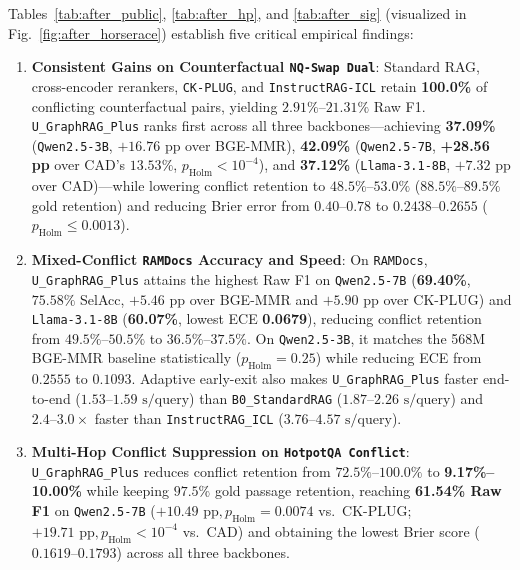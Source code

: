 \documentclass[11pt]{article}
\begin{document}
Tables~\ref{tab:after_public}, \ref{tab:after_hp}, and \ref{tab:after_sig} (visualized in Fig.~\ref{fig:after_horserace}) establish five critical empirical findings:
\begin{enumerate}[leftmargin=*,nosep]
    \item \textbf{Consistent Gains on Counterfactual \texttt{NQ-Swap Dual}}: Standard RAG, cross-encoder rerankers, \texttt{CK-PLUG}, and \texttt{InstructRAG-ICL} retain \textbf{100.0\%} of conflicting counterfactual pairs, yielding $2.91\%\text{--}21.31\%$ Raw F1. \texttt{U\_GraphRAG\_Plus} ranks first across all three backbones---achieving \textbf{37.09\%} (\texttt{Qwen2.5-3B}, $+16.76\text{ pp}$ over BGE-MMR), \textbf{42.09\%} (\texttt{Qwen2.5-7B}, \textbf{+28.56 pp} over CAD's $13.53\%$, $p_{\text{Holm}}<10^{-4}$), and \textbf{37.12\%} (\texttt{Llama-3.1-8B}, $+7.32\text{ pp}$ over CAD)---while lowering conflict retention to $48.5\%\text{--}53.0\%$ ($88.5\%\text{--}89.5\%$ gold retention) and reducing Brier error from $0.40\text{--}0.78$ to $0.2438\text{--}0.2655$ ($p_{\text{Holm}}\le 0.0013$).
    \item \textbf{Mixed-Conflict \texttt{RAMDocs} Accuracy and Speed}: On \texttt{RAMDocs}, \texttt{U\_GraphRAG\_Plus} attains the highest Raw F1 on \texttt{Qwen2.5-7B} (\textbf{69.40\%}, $75.58\%$ SelAcc, $+5.46\text{ pp}$ over BGE-MMR and $+5.90\text{ pp}$ over CK-PLUG) and \texttt{Llama-3.1-8B} (\textbf{60.07\%}, lowest ECE \textbf{0.0679}), reducing conflict retention from $49.5\%\text{--}50.5\%$ to $36.5\%\text{--}37.5\%$. On \texttt{Qwen2.5-3B}, it matches the 568M BGE-MMR baseline statistically ($p_{\text{Holm}}=0.25$) while reducing ECE from $0.2555$ to $0.1093$. Adaptive early-exit also makes \texttt{U\_GraphRAG\_Plus} faster end-to-end ($1.53\text{--}1.59\text{ s/query}$) than \texttt{B0\_StandardRAG} ($1.87\text{--}2.26\text{ s/query}$) and $2.4\text{--}3.0\times$ faster than \texttt{InstructRAG\_ICL} ($3.76\text{--}4.57\text{ s/query}$).
    \item \textbf{Multi-Hop Conflict Suppression on \texttt{HotpotQA Conflict}}: \texttt{U\_GraphRAG\_Plus} reduces conflict retention from $72.5\%\text{--}100.0\%$ to \textbf{9.17\%--10.00\%} while keeping $97.5\%$ gold passage retention, reaching \textbf{61.54\% Raw F1} on \texttt{Qwen2.5-7B} ($+10.49\text{ pp}, p_{\text{Holm}}=0.0074$ vs.\ CK-PLUG; $+19.71\text{ pp}, p_{\text{Holm}}<10^{-4}$ vs.\ CAD) and obtaining the lowest Brier score ($0.1619\text{--}0.1793$) across all three backbones.

\end{enumerate}
\end{document}
